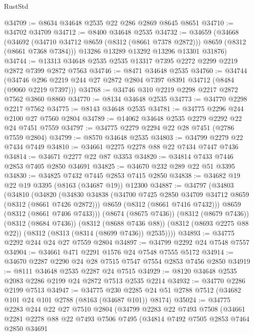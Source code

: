 \begin{lexlean}{RustStd}
\begin{coremodule}
@34709 := @8634 @34648 @2535 @22 @286 @2869 @8645 @8651
@34710 := @34702 @34709
@34712 := @8400 @34648 @2535
@34732 := @34659
    (@34668
      (@34692 (@34710 @34712 @8659 (@8312 (@8661 @7378 @2872))) @8659 (@8312 (@8661 @7368 @7384)))
      @13286
      @13289
      @13292
      @13296
      @13301
      @31876)
@34744 := @13313 @34648 @2535 @2535 @13317 @7395 @2272 @2299 @2219 @2872 @7399 @2872 @7563
@34746 := @8471 @34648 @2535
@34760 := @34744
    (@34746 @296 @2219 @244 @27 @2872 @2804 @7397 @8391 @34712 (@8484 (@9060 @2219 @7397)))
@34768 := @34746 @310 @2219 @2298 @2217 @2872 @7562 @3860 @8860
@34770 := @8134 @34648 @2535
@34773 := @34770 @2298 @2217 @7562
@34775 := @8143 @34648 @2535
@34781 := @34775 @2296 @244 @2100 @27 @7560 @2804
@34789 := @14062 @34648 @2535 @2279 @2292 @22 @24 @7451 @7559
@34797 := @34775 @2279 @2294 @22 @28 @7451 (@2786 @7559 @2804)
@34799 := @8570 @34648 @2535
@34803 := @34799 @2279 @22 @7434 @7449
@34810 := @34661 @2275 @2278 @88 @22 @7434 @7447 @7436
@34814 := @34671 @2277 @22 @87 @3353
@34820 := @34814 @7433 @7446 @2853 @7405 @2850 @34691
@34825 := @34670 @232 @289 @22 @51 @3395
@34830 := @34825 @7432 @7445 @2853 @7415 @2850
@34838 := @34682 @19 @22 @19 @3395 (@8163 (@34687 @19)) @12300
@34887 := @34797
    (@34803
      (@34810
        (@34820
          (@34830
            @34838
            (@34700 @7425 @2850 @34709 @34712 @8659 (@8312 (@8661 @7426 @2872)))
            @8659
            (@8312 (@8661 @7416 @7432)))
          @8659
          (@8312 (@8661 @7406 @7433)))
        (@8674 (@8675 @7436))
        (@8312 (@8679 @7436))
        (@8312 (@8684 @7436))
        (@8312 (@8688 @7436 @88))
        (@8312 (@8693 @2275 @88 @22))
        (@8312 (@8313 (@8314 (@8699 @7436)) @2535))))
@34893 := @34775 @2292 @244 @24 @27 @7559 @2804
@34897 := @34799 @2292 @24 @7548 @7557
@34904 := @34661 @471 @2291 @1576 @24 @7548 @7555 @5172
@34914 := @34670 @2287 @2290 @24 @28 @7515 @7547 @7554 @2853 @7456 @2850
@34919 := @8111 @34648 @2535 @2287 @24 @7515
@34929 := @8120 @34648 @2535 @2083 @2286 @2199 @24 @2872 @7513 @2535 @2214
@34932 := @34770 @2286 @2199 @7513
@34947 := @34775
    @230
    @2285
    @24
    @51
    @2788
    @7512
    (@34682 @101 @24 @101 @2788 (@8163 (@34687 @101)) @8174)
@35024 := @34775
    @2283
    @244
    @22
    @27
    @7510
    @2804
    (@34799
      @2283
      @22
      @7493
      @7508
      (@34661
        @2281
        @2278
        @88
        @22
        @7493
        @7506
        @7495
        (@34814
          @7492
          @7505
          @2853
          @7464
          @2850
          @34691

\end{coremodule}
\end{lexlean}
